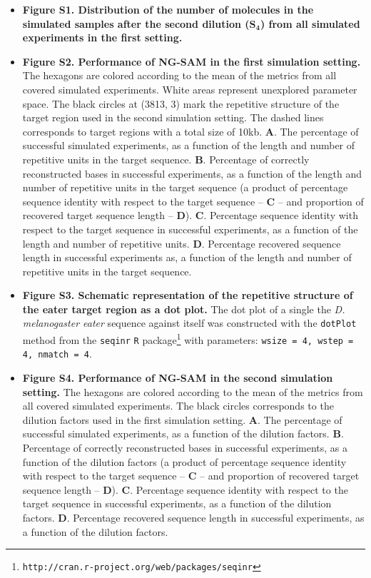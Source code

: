 \documentclass[10pt]{article}
\newcommand{\blue}[1]{{\color{blue} #1}}
\begin{document}
\begin{itemize}

\item {\bf Figure S1. Distribution of the number of molecules in the simulated samples after the second dilution ($\mathbf{S_4}$) from all simulated experiments in the first setting.}


\item {\bf Figure S2. Performance of NG-SAM in the first simulation setting.} 
The hexagons are colored according to the mean of the metrics from all covered simulated experiments. White areas represent unexplored parameter space.
The black circles at (3813, 3) mark the repetitive structure of the target region used in the second simulation setting. The dashed lines corresponds to target regions with a \blue{total} size of 10kb.
{\bf A}. The percentage of successful simulated experiments, as a function of the length and number of repetitive units in the target sequence. {\bf B}. Percentage of correctly reconstructed bases in successful experiments, as a function of the length and number of repetitive units in the target sequence (a product of percentage sequence identity with respect to the target sequence -- {\bf C} -- and proportion of recovered target sequence length  -- {\bf D}). {\bf C}. Percentage sequence identity with respect to the target sequence in successful experiments, as a function of the length and number of repetitive units. {\bf D}. Percentage recovered sequence length in successful experiments as, a function of the length and number of repetitive units in the target sequence.


\item {\bf Figure S3. Schematic representation of the repetitive structure of the eater target region as a dot plot. }The dot plot of a single the {\it D. melanogaster eater} sequence against itself was constructed with the {\tt dotPlot} method from the {\tt seqinr} {\tt R} package\footnote{{\tt http://cran.r-project.org/web/packages/seqinr}} with parameters: {\tt wsize = 4, wstep = 4, nmatch = 4}.


\item {\bf Figure S4. Performance of NG-SAM in the second simulation setting.} 
The hexagons are colored according to the mean of the metrics from all covered simulated experiments.
The black circles corresponds to the dilution factors used in the first simulation setting.
{\bf A}. The percentage of successful simulated experiments, as a function of the dilution factors. {\bf B}. Percentage of correctly reconstructed bases in successful experiments, as a function of the dilution factors (a product of percentage sequence identity with respect to the target sequence -- {\bf C} -- and proportion of recovered target sequence length  -- {\bf D}). {\bf C}. Percentage sequence identity with respect to the target sequence in successful experiments, as a function of the dilution factors. {\bf D}. Percentage recovered sequence length in successful experiments, as a function of the dilution factors.


\end{itemize}
\end{document}
